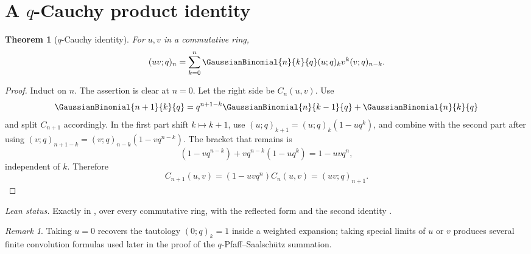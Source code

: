 \documentclass[11pt,a4paper,oneside,openany]{book}
\newtheorem{theorem}{Theorem}[chapter]
\theoremstyle{definition}
\theoremstyle{remark}
\newtheorem{remark}[remark]{Remark}
\begin{document}
\section{A \texorpdfstring{$q$}{q}-Cauchy product identity}

\begin{theorem}[$q$-Cauchy identity]\label{thm:q-cauchy}
For $u,v$ in a commutative ring,
\[
 (uv;q)_n
 =\sum_{k=0}^{n}\GaussianBinomial{n}{k}{q} (u;q)_k v^k(v;q)_{n-k}.
\]
\end{theorem}

\begin{proof}
Induct on $n$.  The assertion is clear at $n=0$.  Let the right side be $C_n(u,v)$.  Use
\[
 \GaussianBinomial{n+1}{k}{q}=q^{n+1-k}\GaussianBinomial{n}{k-1}{q}+\GaussianBinomial{n}{k}{q}
\]
and split $C_{n+1}$ accordingly.  In the first part shift $k\mapsto k+1$, use
\((u;q)_{k+1}=(u;q)_k(1-uq^k)\), and combine with the second part after using
\((v;q)_{n+1-k}=(v;q)_{n-k}(1-vq^{n-k})\).
The bracket that remains is
\[
 (1-vq^{n-k})+vq^{n-k}(1-uq^k)=1-uvq^n,
\]
independent of $k$.  Therefore
\[
 C_{n+1}(u,v)=(1-uvq^n)C_n(u,v)=(uv;q)_{n+1}.
\]
\end{proof}

\emph{Lean status.}  Exactly  in
, over every commutative ring, with the reflected form
 and the second identity
.


\begin{remark}
Taking $u=0$ recovers the tautology $(0;q)_k=1$ inside a weighted expansion; taking special limits of $u$ or $v$ produces several finite convolution formulas used later in the proof of the $q$-Pfaff--Saalsch\"utz summation.
\end{remark}
\end{document}
